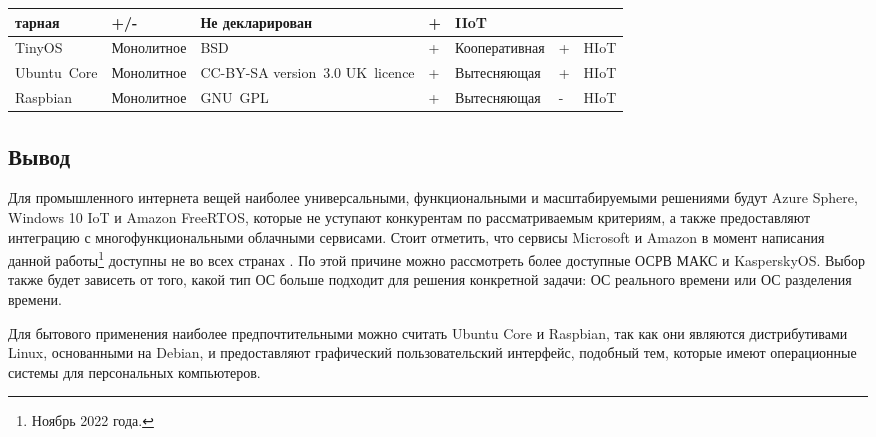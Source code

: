 \begin{longtable}[Hc]{|p{2.8cm}|p{2.6cm}|p{2.5cm}|p{0.6cm}|p{3.5cm}|p{0.6cm}|p{1cm}|}
	\linebreak тарная 	  & +/- & Не декларирован 		   & + & IIoT\\
	\hline
	TinyOS              & Монолитное & BSD 				      & +   & Кооперативная 		   & + & HIoT\\
	\hline
	Ubuntu~Core         & Монолитное & CC-BY-SA
	\linebreak \mbox{version~3.0}
	\linebreak UK~licence  & +   & Вытесняющая 			   & + & HIoT\\ %
	\hline
	Raspbian            & Монолитное & GNU~GPL 				  & +   & Вытесняющая 			   & - & HIoT\\
	\hline
\end{longtable}



\subsection{Вывод}



Для промышленного интернета вещей наиболее универсальными, функциональными и масштабируемыми решениями будут Azure Sphere, Windows 10 IoT и Amazon FreeRTOS, которые не уступают конкурентам по рассматриваемым критериям, а также предоставляют интеграцию с многофункциональными облачными сервисами. Стоит отметить, что сервисы Microsoft и Amazon в момент написания данной работы\footnote{Ноябрь 2022 года.} доступны не во всех странах \cite{Microsoft_ban} \cite{Amazon_ban}. По этой причине можно рассмотреть более доступные ОСРВ МАКС и KasperskyOS. Выбор также будет зависеть от того, какой тип ОС больше подходит для решения конкретной задачи: ОС реального времени или ОС разделения времени. 

Для бытового применения наиболее предпочтительными можно считать Ubuntu Core и Raspbian, так как они являются дистрибутивами Linux, основанными на Debian, и предоставляют графический пользовательский интерфейс, подобный тем, которые имеют операционные системы для персональных компьютеров.

\pagebreak